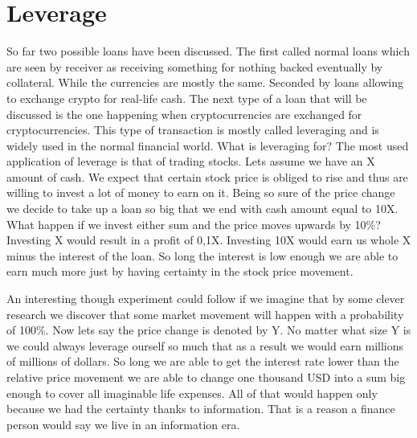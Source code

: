 \documentclass[a4paper,12pt,twoside,openany]{report}
\begin{document}
\section{Leverage}
So far two possible loans have been discussed. The first called normal loans which are seen by receiver as receiving something for nothing backed eventually by collateral. While the currencies are mostly the same.  Seconded by loans allowing to exchange crypto for real-life cash. The next type of a loan that will be discussed is the one happening when cryptocurrencies are exchanged for cryptocurrencies. This type of transaction is mostly called leveraging and is widely used in the normal financial world. What is leveraging for? The most used application of leverage is that of trading stocks. Lets assume we have an X amount of cash. We expect that certain stock price is obliged to rise and thus are willing to invest a lot of money to earn on it. Being so sure of the price change we decide to take up a loan so big that we end with cash amount equal to 10X. What happen if we invest either sum and the price moves upwards by 10\%? Investing X would result in a profit of 0,1X. Investing 10X would earn us whole X minus the interest of the loan. So long the interest is low enough we are able to earn much more just by having certainty in the stock price movement.

An interesting though experiment could follow if we imagine that by some clever research we discover that some market movement will happen with a probability of 100\%. Now lets say the price change is denoted by Y. No matter what size Y is we could always leverage ourself so much that as a result we would earn millions of millions of dollars. So long we are able to get the interest rate lower than the relative price movement we are able to change one thousand USD into a sum big enough to cover all imaginable life expenses. All of that would happen only because we had the certainty thanks to information. That is a reason a finance person would say we live in an information era.
\end{document}
